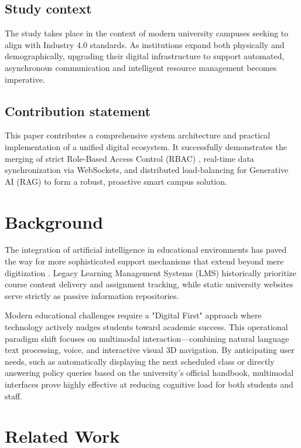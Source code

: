 \documentclass[]{einformatica}
\begin{document}
\subsection*{Study context}

The study takes place in the context of modern university campuses seeking to align with Industry 4.0 standards. As institutions expand both physically and demographically, upgrading their digital infrastructure to support automated, asynchronous communication and intelligent resource management becomes imperative.

\subsection*{Contribution statement}

This paper contributes a comprehensive system architecture and practical implementation of a unified digital ecosystem. It successfully demonstrates the merging of strict Role-Based Access Control (RBAC) \cite{sandhu1996}, real-time data synchronization via WebSockets, and distributed load-balancing for Generative AI (RAG) to form a robust, proactive smart campus solution.


\section{Background}\label{sec:Background}

The integration of artificial intelligence in educational environments has paved the way for more sophisticated support mechanisms that extend beyond mere digitization \cite{yang2023, li2023}. Legacy Learning Management Systems (LMS) historically prioritize course content delivery and assignment tracking, while static university websites serve strictly as passive information repositories. 

Modern educational challenges require a "Digital First" approach where technology actively nudges students toward academic success. This operational paradigm shift focuses on multimodal interaction—combining natural language text processing, voice, and interactive visual 3D navigation. By anticipating user needs, such as automatically displaying the next scheduled class or directly answering policy queries based on the university's official handbook, multimodal interfaces prove highly effective at reducing cognitive load for both students and staff.

\section{Related Work}\label{sec:RelatedWork}
\end{document}
